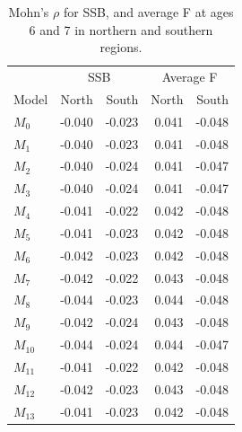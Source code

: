 \documentclass[
]{article}
\begin{document}
\begin{table}

\caption{\label{tab:rho-table}Mohn's $\rho$ for SSB, and average F at ages 6 and 7 in northern and southern regions.}
\centering
\begin{tabular}[t]{lrrrr}
\toprule
\multicolumn{1}{c}{ } & \multicolumn{2}{c}{SSB} & \multicolumn{2}{c}{Average F} \\
\cmidrule(l{3pt}r{3pt}){2-3} \cmidrule(l{3pt}r{3pt}){4-5}
Model & North & South & North & South\\
\midrule
$M_{0}$ & -0.040 & -0.023 & 0.041 & -0.048\\
$M_{1}$ & -0.040 & -0.023 & 0.041 & -0.048\\
$M_{2}$ & -0.040 & -0.024 & 0.041 & -0.047\\
$M_{3}$ & -0.040 & -0.024 & 0.041 & -0.047\\
$M_{4}$ & -0.041 & -0.022 & 0.042 & -0.048\\
\addlinespace
$M_{5}$ & -0.041 & -0.023 & 0.042 & -0.048\\
$M_{6}$ & -0.042 & -0.023 & 0.042 & -0.048\\
$M_{7}$ & -0.042 & -0.022 & 0.043 & -0.048\\
$M_{8}$ & -0.044 & -0.023 & 0.044 & -0.048\\
$M_{9}$ & -0.042 & -0.024 & 0.043 & -0.048\\
\addlinespace
$M_{10}$ & -0.044 & -0.024 & 0.044 & -0.047\\
$M_{11}$ & -0.041 & -0.022 & 0.042 & -0.048\\
$M_{12}$ & -0.042 & -0.023 & 0.043 & -0.048\\
$M_{13}$ & -0.041 & -0.023 & 0.042 & -0.048\\
\bottomrule
\end{tabular}
\end{table}
\end{document}
